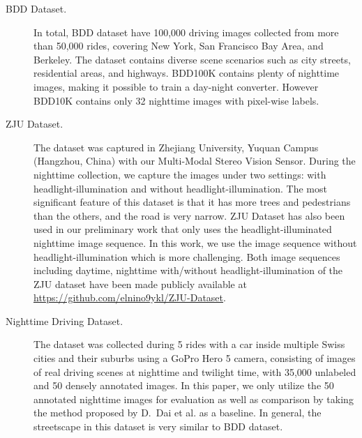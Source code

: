 \documentclass[a4paper]{spie}
\begin{document}
\begin{description}
   \item[BDD Dataset\cite{yu2018bdd100k}.] In total, BDD dataset have 100,000 driving images collected from more than 50,000 rides, covering New York, San Francisco Bay Area, and Berkeley. The dataset contains diverse scene scenarios such as city streets, residential areas, and highways. BDD100K contains plenty of nighttime images, making it possible to train a day-night converter. However BDD10K contains only 32 nighttime images with pixel-wise labels.
   \item[ZJU Dataset.] The dataset was captured in Zhejiang University, Yuquan Campus (Hangzhou, China) with our Multi-Modal Stereo Vision Sensor\cite{sun2019multi}. During the nighttime collection, we capture the images under two settings: with headlight-illumination and without headlight-illumination. The most significant feature of this dataset is that it has more trees and pedestrians than the others, and the road is very narrow. ZJU Dataset has also been used in our preliminary work\cite{romera2019bridging} that only uses the headlight-illuminated nighttime image sequence. In this work, we use the image sequence without headlight-illumination which is more challenging. Both image sequences including daytime, nighttime with/without headlight-illumination of the ZJU dataset have been made publicly available at \url{https://github.com/elnino9ykl/ZJU-Dataset}.
   \item[Nighttime Driving Dataset\cite{dai2018dark}.] The dataset was collected during 5 rides with a car inside multiple Swiss cities and their suburbs using a GoPro Hero 5 camera, consisting of images of real driving scenes at nighttime and twilight time, with 35,000 unlabeled and 50 densely annotated images. In this paper, we only utilize the 50 annotated nighttime images for evaluation as well as comparison by taking the method proposed by D.~Dai et al.\cite{dai2018dark} as a baseline. In general, the streetscape in this dataset is very similar to BDD dataset.
 \end{description}
\end{document}
